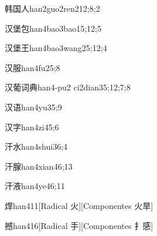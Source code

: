 \begin{verbete}{韩国人}{han2guo2ren2}{12;8;2}
\end{verbete}

\begin{verbete}{汉堡包}{han4bao3bao1}{5;12;5}
\end{verbete}

\begin{verbete}{汉堡王}{han4bao3wang2}{5;12;4}
\end{verbete}

\begin{verbete}{汉服}{han4fu2}{5;8}
\end{verbete}

\begin{verbete}{汉葡词典}{han4-pu2 ci2dian3}{5;12;7;8}
\end{verbete}

\begin{verbete}{汉语}{han4yu3}{5;9}
\end{verbete}

\begin{verbete}{汉字}{han4zi4}{5;6}
\end{verbete}

\begin{verbete}{汗水}{han4shui3}{6;4}
\end{verbete}

\begin{verbete}{汗腺}{han4xian4}{6;13}
\end{verbete}

\begin{verbete}{汗液}{han4ye4}{6;11}
\end{verbete}

\begin{verbete}{焊}{han4}{11}[Radical 火][Componentes 火旱]
\end{verbete}

\begin{verbete}{撼}{han4}{16}[Radical 手][Componentes 扌感]
\end{verbete}

